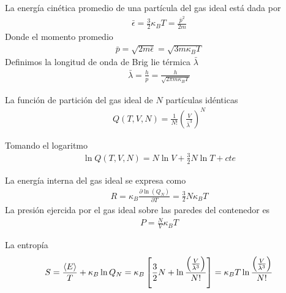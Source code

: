 \documentclass{article}
\begin{document}
La energía cinética promedio de una partícula del gas ideal está dada por 
\begin{gather*}
  \bar \epsilon = \frac{3 }{2} \kappa_B T = \frac{\bar p^2 }{2m } 
\end{gather*}
Donde el momento promedio 
\begin{gather*}
  \bar p = \sqrt{2m \bar \epsilon}  = \sqrt{3m\kappa_B T } 
\end{gather*}
Definimos la longitud de onda de Brig lie térmica $ \bar \lambda $ 
\begin{gather*}
  \bar \lambda = \frac{h }{p } = \frac{h }{\sqrt{2\pi m \kappa_B T } } 
\end{gather*}

La función de partición del gas ideal de $ N  $ partículas idénticas 
\begin{gather}
  Q(T,V,N) = \frac{1}{N! } \left(\frac{V }{\bar \lambda^3 }\right)^N 
\end{gather}

Tomando el logaritmo 
\begin{gather}
  \ln{Q(T,V,N)  } = N \ln{V} + \frac{3 }{2} N \ln{T} + cte
\end{gather}

\hfill 

La energía interna del gas ideal se expresa como 
\begin{gather*}
  R = \kappa_B \frac{\partial \ln(Q_N)  }{\partial T} = \frac{3}{2} N\kappa_B T  
\end{gather*}
La presión ejercida por el gas ideal sobre las paredes del contenedor es 
\begin{gather*}
  P = \frac{N}{V } \kappa_B T  
\end{gather*}

La entropía 
\begin{gather*}
  S = \frac{\expval{E }}{T } + \kappa_B \ln{Q_N   } 
  = \kappa_B \left[\frac{3}{2} N + \ln\frac{\left(\frac{V}{\bar \lambda^3 }\right)}{N! }\right] 
  = \kappa_B T \ln\frac{\left(\frac{V}{\bar \lambda^3 }\right)}{N! }
\end{gather*}
\end{document}
